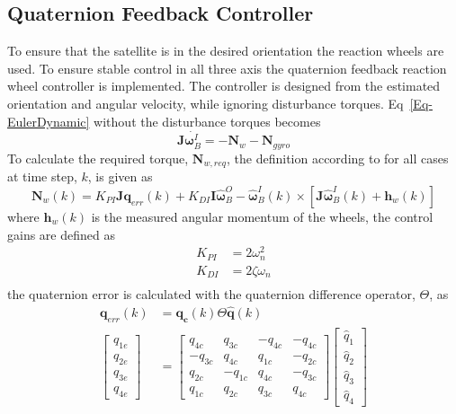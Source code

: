\subsection{Quaternion Feedback Controller}
\label{section: Quaternion Feedback Controller}
To ensure that the satellite is in the desired orientation the reaction wheels are used. To ensure stable control in all three axis \cite{wie1989quarternion} the quaternion feedback reaction wheel controller is implemented. The controller is designed from the estimated orientation and angular velocity, while ignoring disturbance torques. Eq~\ref{Eq-EulerDynamic} without the disturbance torques becomes
\begin{equation}
\mathbf{J}\dot{\boldsymbol{\omega}_B^I} = -\mathbf{N}_w - \mathbf{N}_{gyro}
\end{equation}
To calculate the required torque, $\mathbf{N}_{w,req}$, the definition according to \cite{steyn2008attitude} for all cases at time step, $k$, is given as
\begin{equation}
	\mathbf{N}_w(k) = K_{PI}\mathbf{Jq}_{err}(k) + K_{DI}\mathbf{I}\hat{\boldsymbol{\omega}}_B^O - \hat{\boldsymbol{\omega}}_B^I(k) \times [\mathbf{J}\hat{\boldsymbol{\omega}}_B^I(k) + \mathbf{h}_{w}(k)]
\end{equation}
where $\mathbf{h}_{w}(k)$ is the measured angular momentum of the wheels, the control gains are defined as
\begin{equation}
	\begin{aligned}
		K_{PI} &= 2 \omega_n^2\\
		K_{DI} &= 2 \zeta \omega_n \\
	\end{aligned}
	\label{eq:controlGain}
\end{equation}
the quaternion error is calculated with the quaternion difference operator, $\Theta$, as
\begin{equation}
	\begin{aligned}
		\mathbf{q}_{err}(k) &= \mathbf{q_c}(k) \Theta \hat{\mathbf{q}}(k) \\
		\begin{bmatrix} 
			q_{1e} \\
			q_{2e} \\
			q_{3e} \\
			q_{4e}
		\end{bmatrix} &= \begin{bmatrix} 
			q_{4c} & q_{3c} & -q_{4c} & -q_{4c} \\
			-q_{3c} & q_{4c} & q_{1c} & -q_{2c} \\
			q_{2c} & - q_{1c} & q_{4c} & -q_{3c} \\
			q_{1c} & q_{2c} & q_{3c} & q_{4c}
		\end{bmatrix}
		\begin{bmatrix} 
			\hat{q}_1 \\
			\hat{q}_2 \\
			\hat{q}_3 \\
			\hat{q}_4
		\end{bmatrix}
	\end{aligned}
	\label{eq:quaternionError}
\end{equation}
